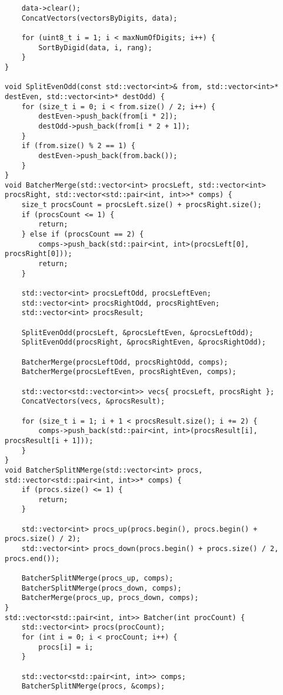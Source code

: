 \documentclass{report}
\begin{document}
\begin{lstlisting}
    data->clear();
    ConcatVectors(vectorsByDigits, data);

    for (uint8_t i = 1; i < maxNumOfDigits; i++) {
        SortByDigid(data, i, rang);
    }
}

void SplitEvenOdd(const std::vector<int>& from, std::vector<int>* destEven, std::vector<int>* destOdd) {
    for (size_t i = 0; i < from.size() / 2; i++) {
        destEven->push_back(from[i * 2]);
        destOdd->push_back(from[i * 2 + 1]);
    }
    if (from.size() % 2 == 1) {
        destEven->push_back(from.back());
    }
}
void BatcherMerge(std::vector<int> procsLeft, std::vector<int> procsRight, std::vector<std::pair<int, int>>* comps) {
    size_t procsCount = procsLeft.size() + procsRight.size();
    if (procsCount <= 1) {
        return;
    } else if (procsCount == 2) {
        comps->push_back(std::pair<int, int>(procsLeft[0], procsRight[0]));
        return;
    }

    std::vector<int> procsLeftOdd, procsLeftEven;
    std::vector<int> procsRightOdd, procsRightEven;
    std::vector<int> procsResult;

    SplitEvenOdd(procsLeft, &procsLeftEven, &procsLeftOdd);
    SplitEvenOdd(procsRight, &procsRightEven, &procsRightOdd);

    BatcherMerge(procsLeftOdd, procsRightOdd, comps);
    BatcherMerge(procsLeftEven, procsRightEven, comps);

    std::vector<std::vector<int>> vecs{ procsLeft, procsRight };
    ConcatVectors(vecs, &procsResult);

    for (size_t i = 1; i + 1 < procsResult.size(); i += 2) {
        comps->push_back(std::pair<int, int>(procsResult[i], procsResult[i + 1]));
    }
}
void BatcherSplitNMerge(std::vector<int> procs, std::vector<std::pair<int, int>>* comps) {
    if (procs.size() <= 1) {
        return;
    }

    std::vector<int> procs_up(procs.begin(), procs.begin() + procs.size() / 2);
    std::vector<int> procs_down(procs.begin() + procs.size() / 2, procs.end());

    BatcherSplitNMerge(procs_up, comps);
    BatcherSplitNMerge(procs_down, comps);
    BatcherMerge(procs_up, procs_down, comps);
}
std::vector<std::pair<int, int>> Batcher(int procCount) {
    std::vector<int> procs(procCount);
    for (int i = 0; i < procCount; i++) {
        procs[i] = i;
    }

    std::vector<std::pair<int, int>> comps;
    BatcherSplitNMerge(procs, &comps);


\end{lstlisting}
\end{document}
